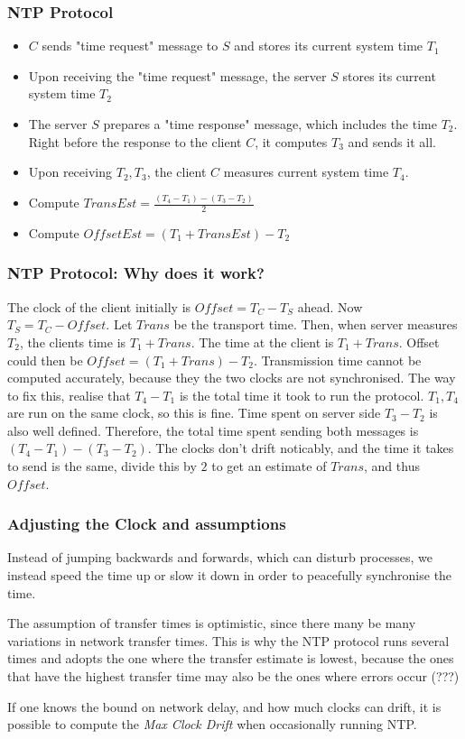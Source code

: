 \documentclass[14pt]{beamer}
\begin{document}
        \begin{frame}
            \frametitle{NTP Protocol}
                \begin{itemize}
                    \item $C$ sends "time request" message to $S$ and stores its current system time $T_1$
                    \item Upon receiving the "time request" message, the server $S$ stores its current system time $T_2$
                    \item The server $S$ prepares a "time response" message, which includes the time $T_2$. Right before the response to the client $C$, it computes $T_3$ and sends it all. 
                    \item Upon receiving $T_2, T_3$, the client $C$ measures current system time $T_4$. 
                    \item Compute $TransEst = \frac{(T_4 - T_1) - (T_3 - T_2)}{2}$
                    \item Compute $OffsetEst = (T_1 + TransEst) - T_2$             
                \end{itemize}
        \end{frame}
        \begin{frame}
            \frametitle{NTP Protocol: Why does it work?}
                The clock of the client initially is $Offset = T_C - T_S$ ahead. Now $T_S = T_C - Offset$. Let $Trans$ be the transport time. Then, when server measures $T_2$, the clients time is $T_1 + Trans$. The time at the client is $T_1 + Trans$. Offset could then be $Offset = (T_1 + Trans) - T_2$. Transmission time cannot be computed accurately, because they the two clocks are not synchronised. The way to fix this, realise that $T_4 - T_1$ is the total time it took to run the protocol. $T_1, T_4$ are run on the same clock, so this is fine. Time spent on server side $T_3 - T_2$ is also well defined. Therefore, the total time spent sending both messages is $(T_4 - T_1) - (T_3 - T_2)$. The clocks don't drift noticably, and the time it takes to send is the same, divide this by $2$ to get an estimate of $Trans$, and thus $Offset$. 
        \end{frame}
        \begin{frame}
            \frametitle{Adjusting the Clock and assumptions}
                 Instead of jumping backwards and forwards, which can disturb processes, we instead speed the time up or slow it down in order to 
                 peacefully synchronise the time. 

                 The assumption of transfer times is optimistic, since there many be many variations in network transfer times. This is why the NTP protocol runs several times and adopts the one where the transfer estimate is lowest, because the ones that have the highest transfer time may also be the ones where errors occur (???)

                 If one knows the bound on network delay, and how much clocks can drift, it is possible to compute the \textit{Max Clock Drift} when occasionally running NTP.
        \end{frame}
\end{document}
